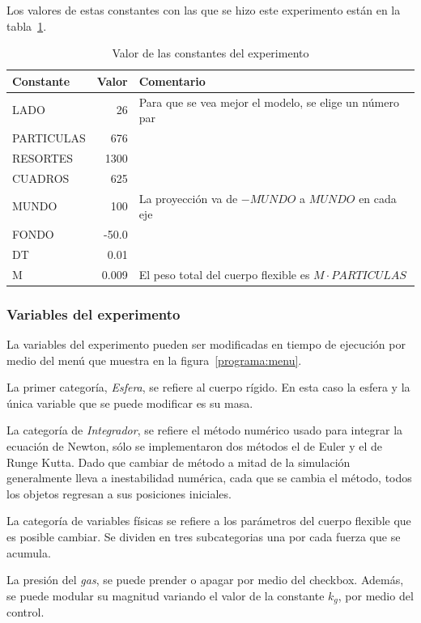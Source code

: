 Los valores de estas constantes con las que se hizo este experimento están en la tabla~\ref{valores:constantes}.
\begin{table}
\begin{center}
\begin{tabular} {@{}lrp{10cm}@{}}
\toprule
Constante & Valor & Comentario\\ 
\midrule
 LADO & 26 & Para que se vea mejor el modelo, se elige un número par\\
 PARTICULAS & 676 &  \\
 RESORTES & 1300 & \\
 CUADROS & 625 & \\ 
\midrule
 MUNDO & 100 & La proyección va de $-MUNDO$ a $MUNDO$ en cada eje\\
 FONDO & -50.0 & \\ 
\midrule 
 DT & 0.01 & \\ 
\midrule
 M & 0.009 & El peso total del cuerpo flexible es $M \cdot PARTICULAS$ \\
\bottomrule
\end{tabular}
\caption[Tabla con los valores de las constantes durante el experimento]{Valor de las constantes del experimento}
\label{valores:constantes}
\end{center}
\end{table}

\subsubsection{Variables del experimento}
La variables del experimento pueden ser modificadas en tiempo de ejecución por medio del menú que muestra en la figura~\ref{programa:menu}.

La primer categoría, \emph{Esfera}, se refiere al cuerpo rígido.
En esta caso la esfera y la única variable que se puede modificar es su masa.

La categoría de \emph{Integrador}, se refiere el método numérico usado para integrar la ecuación de Newton, sólo se implementaron dos métodos el de Euler y el de Runge Kutta.
Dado que cambiar de método a mitad de la simulación generalmente lleva a inestabilidad numérica, cada que se cambia el método, todos los objetos regresan a sus posiciones iniciales.

La categoría de variables físicas se refiere a los parámetros del cuerpo flexible que es posible cambiar.
Se dividen en tres subcategorias una por cada fuerza que se acumula.

La presión del \emph{gas}, se puede prender o apagar por medio del checkbox. 
Además, se puede modular su magnitud variando el valor de la constante $k_{g}$, por medio del control.

